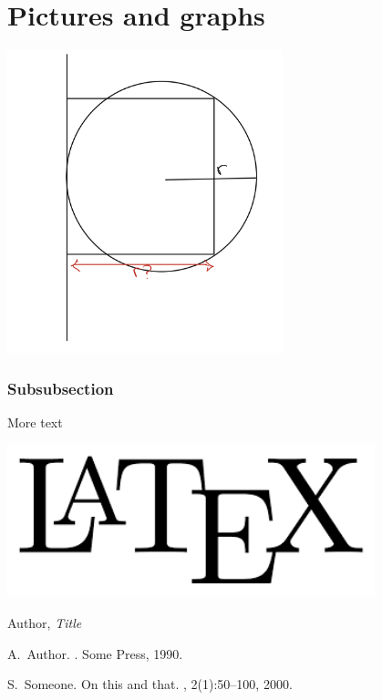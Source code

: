 \documentclass[12pt,a4paper]{article}
\theoremstyle{definition}
\theoremstyle{remark}
\begin{document}
\section{Pictures and graphs}\label{sec:pictures_graphs}

\includegraphics[width=0.6\textwidth]{./figs/radius_scure.jpg}

\subsubsection{Subsubsection}\label{sec:nothing2}

More text \cite{Someone2000}

\includegraphics[width=0.8\textwidth]{./figs/latex_logo.png}

\newpage
\begin{thebibliography}{99}

	Author,
	\emph{Title}


    A.~Author.
    .
    \newblock Some Press, 1990.

    S.~Someone.
    \newblock On this and that.
    , 2(1):50--100,
    2000.
\end{thebibliography}
\end{document}
